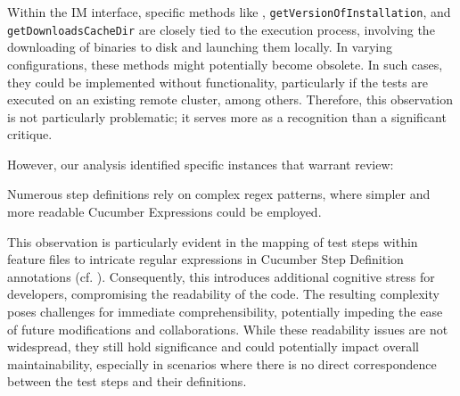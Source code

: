 Within the \ac{IM} interface, specific methods like \texttt{}, \texttt{getVersionOfInstallation}, and \texttt{getDownloadsCacheDir} are closely tied to the execution process, involving the downloading of binaries to disk and launching them locally. In varying configurations, these methods might potentially become obsolete. In such cases, they could be implemented without functionality, particularly if the tests are executed on an existing remote cluster, among others. Therefore, this observation is not particularly problematic; it serves more as a recognition than a significant critique.

However, our analysis identified specific instances that warrant review:
\begin{observation}
    Numerous step definitions rely on complex regex patterns, where simpler and more readable Cucumber Expressions could be employed. 
\end{observation}
This observation is particularly evident in the mapping of test steps within feature files to intricate regular expressions in Cucumber Step Definition annotations (cf. ). Consequently, this introduces additional cognitive stress for developers, compromising the readability of the code. The resulting complexity poses challenges for immediate comprehensibility, potentially impeding the ease of future modifications and collaborations. While these readability issues are not widespread, they still hold significance and could potentially impact overall maintainability, especially in scenarios where there is no direct correspondence between the test steps and their definitions.